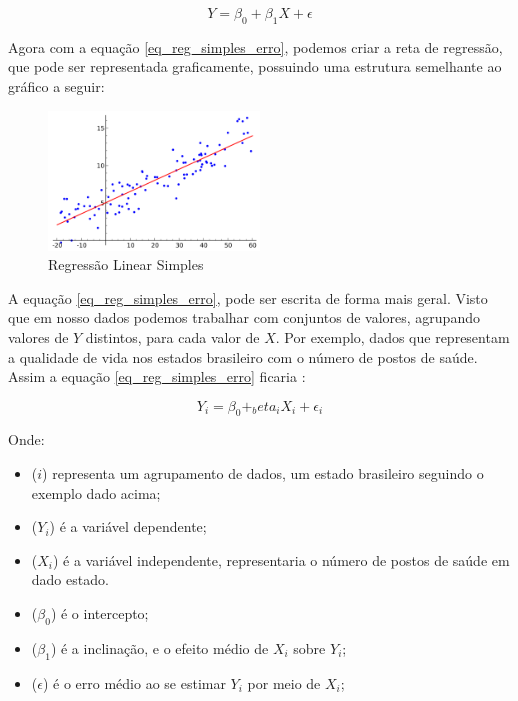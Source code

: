 \documentclass[
	12pt,				%
	openright,			%
	oneside,			%
	a4paper,			%
	english,			%
	brazil				%
	]{abntex2}
\begin{document}
\begin{equation}
	\label{eq_reg_simples_erro}
	Y = \beta_0 + \beta_1X + \epsilon
\end{equation}

Agora com a equação \ref{eq_reg_simples_erro}, podemos criar a reta de regressão, que pode ser
representada graficamente, possuindo uma estrutura semelhante ao gráfico a seguir:

\begin{figure}[H]
    \centering
    \caption{\label{Regressão Linear Simples}Regressão Linear Simples}
    \includegraphics[width=0.50\textwidth]{../Imgs/reg_linear_simples.png}
\end{figure}

A equação \ref{eq_reg_simples_erro}, pode ser escrita de forma mais geral. Visto que em nosso dados
podemos trabalhar com conjuntos de valores, agrupando valores de $Y$ distintos, para cada valor de $X$.
Por exemplo, dados que representam a qualidade de vida nos estados brasileiro com o número de postos 
de saúde. Assim a equação \ref{eq_reg_simples_erro} ficaria \cite{modelos_regressao_linear}:

\begin{equation}
	\label{eq_reg_simples_geral}
	Y_i = \beta_0 + _beta_iX_i + \epsilon_i
\end{equation}

Onde:
\begin{itemize}
	\item ($i$) representa um agrupamento de dados, um estado brasileiro seguindo o exemplo dado acima;
	\item ($Y_i$) é a variável dependente;
	\item ($X_i$) é a variável independente, representaria o número de postos de saúde em dado estado.
	\item ($\beta_0$) é o intercepto;
	\item ($\beta_1$) é a inclinação, e o efeito médio de $X_i$ sobre $Y_i$;
	\item ($\epsilon$) é o erro médio ao se estimar $Y_i$ por meio de $X_i$;
\end{itemize}
\end{document}
